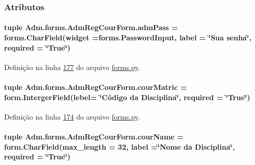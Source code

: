 \subsubsection{Atributos}
\hypertarget{classAdm_1_1forms_1_1AdmRegCourForm_a0b753c4784edb7d3f2bbca64f8883ae9}{
\paragraph[{adm\-Pass}]{\setlength{\rightskip}{0pt plus 5cm}tuple Adm.\-forms.\-Adm\-Reg\-Cour\-Form.\-adm\-Pass = forms.\-Char\-Field(widget =forms.\-Password\-Input, label = \char`\"{}Sua senha\char`\"{}, required = \char`\"{}True\char`\"{})\hspace{0.3cm}{\ttfamily [static]}}}\label{classAdm_1_1forms_1_1AdmRegCourForm_a0b753c4784edb7d3f2bbca64f8883ae9}


Definição na linha \hyperlink{Adm_2forms_8py_source_l00177}{177} do arquivo \hyperlink{Adm_2forms_8py_source}{forms.\-py}.

\hypertarget{classAdm_1_1forms_1_1AdmRegCourForm_a5030e7e3ac46b325e10adc6d39ea9736}{
\paragraph[{cour\-Matric}]{\setlength{\rightskip}{0pt plus 5cm}tuple Adm.\-forms.\-Adm\-Reg\-Cour\-Form.\-cour\-Matric = form.\-Interger\-Field(lebel= \char`\"{}Código da Disciplina\char`\"{}, required = \char`\"{}True\char`\"{})\hspace{0.3cm}{\ttfamily [static]}}}\label{classAdm_1_1forms_1_1AdmRegCourForm_a5030e7e3ac46b325e10adc6d39ea9736}


Definição na linha \hyperlink{Adm_2forms_8py_source_l00174}{174} do arquivo \hyperlink{Adm_2forms_8py_source}{forms.\-py}.

\hypertarget{classAdm_1_1forms_1_1AdmRegCourForm_afc325feb749069ea57387630cc0acc5a}{
\paragraph[{cour\-Name}]{\setlength{\rightskip}{0pt plus 5cm}tuple Adm.\-forms.\-Adm\-Reg\-Cour\-Form.\-cour\-Name = form.\-Char\-Field(max\-\_\-length = 32, label =\char`\"{}Nome da Disciplina\char`\"{}, required = \char`\"{}True\char`\"{})\hspace{0.3cm}{\ttfamily [static]}}}\label{classAdm_1_1forms_1_1AdmRegCourForm_afc325feb749069ea57387630cc0acc5a}


